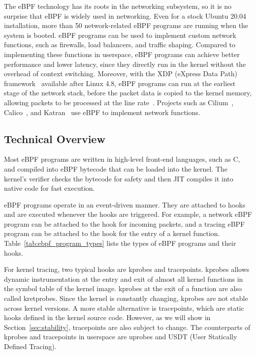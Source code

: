 The eBPF technology has its roots in the networking subsystem, so it is no surprise that eBPF is widely used in networking.
Even for a stock Ubuntu 20.04 installation, more than 50 network-related eBPF programs are running when the system is booted.
eBPF programs can be used to implement custom network functions, such as firewalls, load balancers, and traffic shaping.
Compared to implementing these functions in userspace, eBPF programs can achieve better performance and lower latency,
since they directly run in the kernel without the overhead of context switching.
Moreover, with the XDP (eXpress Data Path) framework~\cite{xdp} available after Linux 4.8, eBPF programs can run at the earliest stage of the network stack,
before the packet data is copied to the kernel memory, allowing packets to be processed at the line rate~\cite{xdp-programming,xdp-paper}.
Projects such as Cilium~\cite{cilium}, Calico~\cite{calico}, and Katran~\cite{katran} use eBPF to implement network functions.

\subsection{Technical Overview}
\label{sec:ebpf_technical_overview}

Most eBPF programs are written in high-level front-end languages, such as C,
and compiled into eBPF bytecode that can be loaded into the kernel.
The kernel's verifier checks the bytecode for safety and then JIT compiles it into native code for fast execution.

eBPF programs operate in an event-driven manner.
They are attached to hooks and are executed whenever the hooks are triggered.
For example, a network eBPF program can be attached to the hook for incoming packets,
and a tracing eBPF program can be attached to the hook for the entry of a kernel function.
Table~\ref{tab:ebpf_program_types} lists the types of eBPF programs and their hooks.

For kernel tracing, two typical hooks are kprobes and tracepoints.
kprobes allows dynamic instrumentation at the entry and exit of almost all kernel functions in the symbol table of the kernel image.
kprobes at the exit of a function are also called kretprobes.
Since the kernel is constantly changing, kprobes are not stable across kernel versions.
A more stable alternative is tracepoints, which are static hooks defined in the kernel source code.
However, as we will show in Section~\ref{sec:stability}, tracepoints are also subject to change.
The counterparts of kprobes and tracepoints in userspace are uprobes and USDT (User Statically Defined Tracing).

